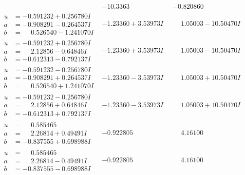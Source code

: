 \documentclass[1p]{elsarticle_modified}
\theoremstyle{definition}
\begin{document}
$$\begin{array}{c|c|c}
 & -10.3363\phantom{ +0.000000I} & -0.820860\phantom{ +0.000000I} \\ \hline\begin{aligned}
u &= -0.591232 + 0.256780 I \\
a &= -0.908291 - 0.264537 I \\
b &= \phantom{-}0.526540 - 1.241070 I\end{aligned}
 & -1.23360 + 3.53973 I & \phantom{-}1.05003 - 10.50470 I \\ \hline\begin{aligned}
u &= -0.591232 + 0.256780 I \\
a &= \phantom{-}2.12856 - 0.64846 I \\
b &= -0.612313 - 0.792137 I\end{aligned}
 & -1.23360 + 3.53973 I & \phantom{-}1.05003 - 10.50470 I \\ \hline\begin{aligned}
u &= -0.591232 - 0.256780 I \\
a &= -0.908291 + 0.264537 I \\
b &= \phantom{-}0.526540 + 1.241070 I\end{aligned}
 & -1.23360 - 3.53973 I & \phantom{-}1.05003 + 10.50470 I \\ \hline\begin{aligned}
u &= -0.591232 - 0.256780 I \\
a &= \phantom{-}2.12856 + 0.64846 I \\
b &= -0.612313 + 0.792137 I\end{aligned}
 & -1.23360 - 3.53973 I & \phantom{-}1.05003 + 10.50470 I \\ \hline\begin{aligned}
u &= \phantom{-}0.585465\phantom{ +0.000000I} \\
a &= \phantom{-}2.26814 + 0.49491 I \\
b &= -0.837555 + 0.698988 I\end{aligned}
 & -0.922805\phantom{ +0.000000I} & \phantom{-}4.16100\phantom{ +0.000000I} \\ \hline\begin{aligned}
u &= \phantom{-}0.585465\phantom{ +0.000000I} \\
a &= \phantom{-}2.26814 - 0.49491 I \\
b &= -0.837555 - 0.698988 I\end{aligned}
 & -0.922805\phantom{ +0.000000I} & \phantom{-}4.16100\phantom{ +0.000000I} \\ \hline\begin{aligned}

\end{aligned}
\end{array}$$
\end{document}
